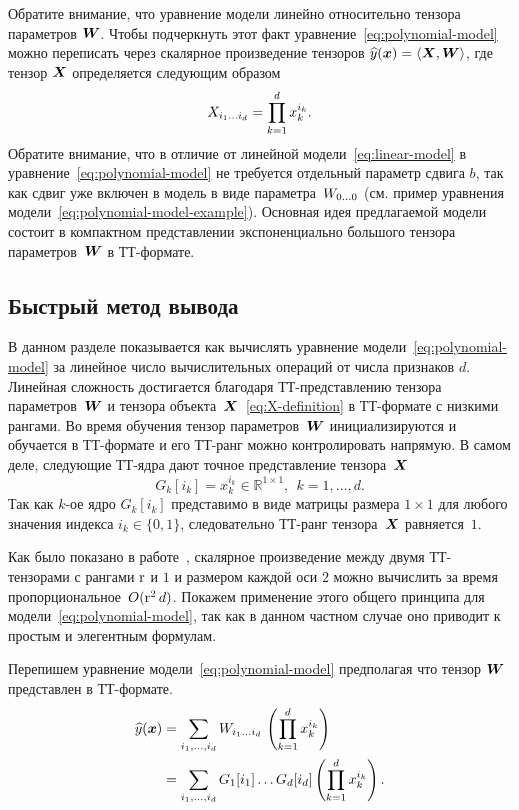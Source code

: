 Обратите внимание, что уравнение модели линейно относительно тензора параметров $\boldsymbol{W}$. Чтобы подчеркнуть этот факт уравнение~\eqref{eq:polynomial-model} можно переписать через скалярное произведение тензоров $\widehat{y}(\boldsymbol{x}) = \langle \boldsymbol{X}, \boldsymbol{W} \rangle$, где тензор $\boldsymbol{X}$ определяется следующим образом
\begin{equation}
\label{eq:X-definition}
X_{i_1 \ldots i_d} = \prod_{k=1}^d x_k^{i_k}.
\end{equation}
Обратите внимание, что в отличие от линейной модели~\eqref{eq:linear-model} в уравнение~\eqref{eq:polynomial-model} не требуется отдельный параметр сдвига $b$, так как сдвиг уже включен в модель в виде параметра~$W_{0 \ldots 0}$ (см. пример уравнения модели~\eqref{eq:polynomial-model-example}).
Основная идея предлагаемой модели состоит в компактном представлении экспоненциально большого тензора параметров~$\boldsymbol{W}$ в ТТ-формате.

\subsection{Быстрый метод вывода \label{sec:exm-inference}}
В данном разделе показывается как вычислять уравнение модели~\eqref{eq:polynomial-model} за линейное число вычислительных операций от числа признаков $d$. Линейная сложность достигается благодаря ТТ-представлению тензора параметров~$\boldsymbol{W}$ и тензора объекта~$\boldsymbol{X}$~\eqref{eq:X-definition} в ТТ-формате с низкими рангами. 
Во время обучения тензор параметров~$\boldsymbol{W}$ инициализируются и обучается в ТТ-формате и его ТТ-ранг можно контролировать напрямую. В самом деле, следующие ТТ-ядра дают точное представление тензора~$\boldsymbol{X}$
\begin{equation*}
G_k[i_k] = x_k^{i_k} \in \mathbb{R}^{1 \times 1}, ~~ k=1, \ldots, d.
\end{equation*}
Так как $k$-ое ядро $G_k[i_k]$ представимо в виде матрицы размера $1 \times 1$ для любого значения индекса $i_k \in \{0, 1\}$, следовательно ТТ-ранг тензора~$\boldsymbol{X}$ равняется~$1$.

Как было показано в работе~\cite{oseledets2011ttMain}, скалярное произведение между двумя ТТ-тензорами с рангами $\operatorname{r}$ и $1$ и размером каждой оси $2$ можно вычислить за время пропорциональное~$O(\operatorname{r}^2 d)$. Покажем применение этого общего принципа для модели~\eqref{eq:polynomial-model}, так как в данном частном случае оно приводит к простым и элегентным формулам.

Перепишем уравнение модели~\eqref{eq:polynomial-model} предполагая что тензор $\boldsymbol{W}$ представлен в ТТ-формате.
\begin{equation*}
\begin{aligned}
\widehat{y}(\boldsymbol{x}) &= \sum_{i_1, \ldots, i_d} W_{i_1 \ldots i_d} \, \left ( \prod_{k=1}^d x_k^{i_k} \right )\\
&= \sum_{i_1, \ldots, i_d} G_1[i_1] \ldots G_d[i_d] \left ( \prod_{k=1}^d x_k^{i_k} \right ).
\end{aligned}
\end{equation*}

